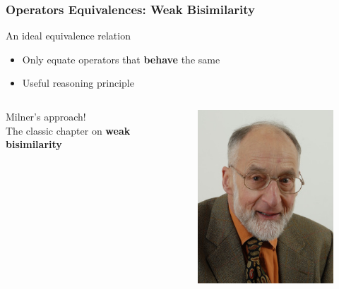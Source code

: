 \documentclass[fleqn,aspectratio=169,10pt]{beamer}
\begin{document}
\begin{frame}[fragile]
  \frametitle{Operators Equivalences:  Weak Bisimilarity}
    \vspace*{-1ex}
  \begin{block}{An ideal equivalence relation}
    \begin{itemize}
      \item Only equate operators that \textbf{behave} the same
      \item Useful reasoning principle
    \end{itemize}
  \end{block}
  \pause
  \begin{itemize}
          \begin{columns}
            \begin{column}{.42\textwidth}
              \item Milner's approach!\\ The classic chapter on \textbf{weak bisimilarity}
            \end{column}
            \begin{column}{.1\textwidth}
              \begin{figure}
                \includegraphics[width=1\textwidth]{milner.jpg}

\end{figure}
\end{column}
\end{columns}
\end{itemize}
\end{frame}
\end{document}
